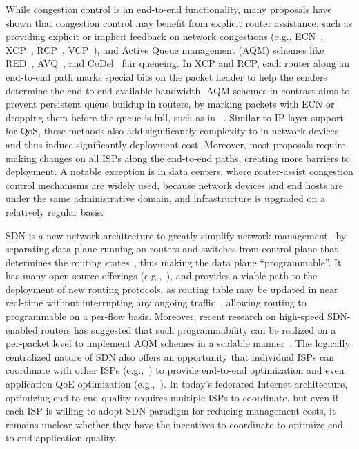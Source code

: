 While congestion control is an end-to-end functionality, many 
proposals have shown that congestion control may benefit from 
explicit router assistance, such as providing explicit or implicit 
feedback on network congestions 
(e.g., ECN~\cite{ecn},
XCP~\cite{xcp}, RCP~\cite{rcp}, VCP~\cite{vcp}),
and Active Queue management (AQM) schemes like RED~\cite{red},
AVQ~\cite{avq}, and CoDel~\cite{codel} fair queueing.
In XCP and RCP, each router along an end-to-end path marks 
special bits on the packet header to help the senders determine the 
end-to-end available bandwidth. 
AQM schemes in contrast aims to prevent persistent queue buildup
in routers, by marking packets with ECN or dropping them before 
the queue is full, such as in ~\cite{red}.
Similar to IP-layer support for QoS, 
these methods also add significantly complexity to in-network
devices and thus induce significantly deployment cost.
Moreover, most proposals require making changes 
on all ISPs along the end-to-end paths, creating more
barriers to deployment.
A notable exception is in data centers, where 
router-assist congestion control mechanisms are widely used, 
because network devices and end hosts are under the same 
administrative domain, and infrastructure is upgraded on a
relatively regular basis.


SDN is a new network architecture 
to greatly simplify network management~\cite{feamster2014road}
by separating data plane running 
on routers and switches from control plane that determines 
the routing states~\cite{OpenFlow}, thus making the data plane 
``programmable''.
It has  many open-source offerings
(e.g.,~\cite{onos,floodlightopenflow}), and provides a viable path to
the deployment of new routing 
protocols, as routing table may be updated in near real-time without
interrupting any ongoing traffic~\cite{rexford-sdn-update},
allowing routing to programmable on a per-flow basis.
Moreover, recent research on high-speed SDN-enabled routers has 
suggested that such programmability can be realized on a per-packet level 
to implement AQM schemes  in a scalable 
manner~\cite{sivaraman2016programmable,sivaraman2016packet}.
The logically centralized nature of SDN also offers an opportunity
that individual ISPs can coordinate with other ISPs
(e.g.,~\cite{schapira2010putting}) to provide end-to-end optimization
and even application QoE optimization (e.g.,~\cite{sdndash}).
In today's federated Internet architecture, optimizing 
end-to-end quality requires multiple ISPs to coordinate, but 
even if each ISP is willing to adopt SDN paradigm for reducing management costs,
it remains unclear whether they have the incentives to coordinate
to optimize end-to-end application quality.

